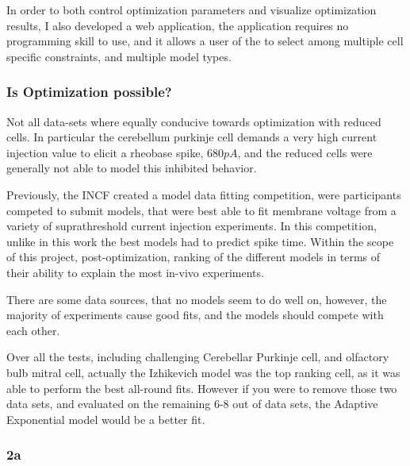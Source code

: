 In order to both control optimization parameters and visualize optimization results, I also developed a web application, the application requires no programming skill to use, and it allows a user of the to select among multiple cell specific constraints, and multiple model types. 
%


\subsubsection{Is Optimization possible?}
Not all data-sets where equally conducive towards optimization with reduced cells. In particular the cerebellum purkinje cell demands a very high current injection value to elicit a rheobase spike, $680pA$, and the reduced cells were generally not able to model this inhibited behavior.

Previously, the INCF created a model data fitting competition, were participants competed to submit models, that were best able to fit membrane voltage from a variety of suprathreshold current injection experiments. In this competition, unlike in this work the best models had to predict spike time. Within the scope of this project, post-optimization, ranking of the different models in terms of their ability to explain the most in-vivo experiments. 

There are some data sources, that no models seem to do well on, however, the majority of experiments cause good fits, and the models should compete with each other.

Over all the tests, including challenging Cerebellar Purkinje cell, and olfactory bulb mitral cell, actually the Izhikevich model was the top ranking cell, as it was able to perform the best all-round fits. However if you were to remove those two data sets, and evaluated on the remaining 6-8 out of data sets, the Adaptive Exponential model would be a better fit.


%

\subsubsection{2a}


